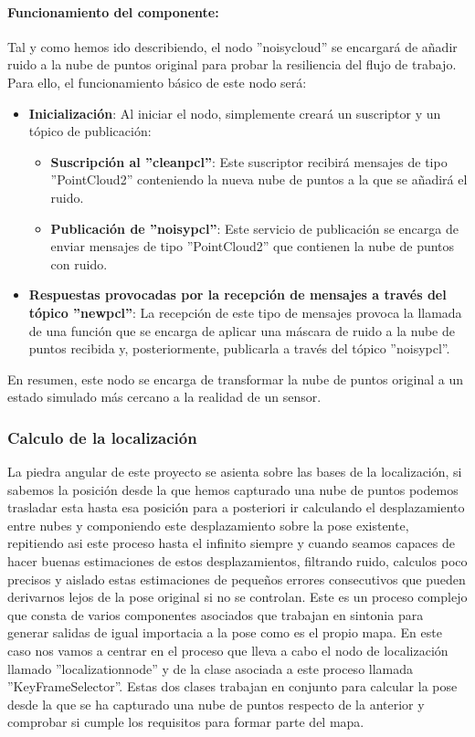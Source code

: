\documentclass[12pt, a4paper, twoside]{article}
\begin{document}
\paragraph{Funcionamiento del componente:} 
Tal y como hemos ido describiendo, el nodo ''noisy\textunderscore cloud'' se encargará de añadir ruido a la nube de puntos original para probar la resiliencia 
del flujo de trabajo. Para ello, el funcionamiento básico de este nodo será:
\begin{itemize}
  \item \textbf{Inicialización}: Al iniciar el nodo, simplemente creará un suscriptor y un tópico de publicación:
  \begin{itemize}
    \item \textbf{Suscripción al ''clean\textunderscore pcl''}: Este suscriptor recibirá mensajes de tipo ''PointCloud2'' conteniendo la nueva nube de puntos
    a la que se añadirá el ruido.
    \item \textbf{Publicación de ''noisy\textunderscore pcl''}: Este servicio de publicación se encarga de enviar mensajes de tipo ''PointCloud2'' que 
    contienen la nube de puntos con ruido. 
  \end{itemize}
  \item \textbf{Respuestas provocadas por la recepción de mensajes a través del tópico ''new\textunderscore pcl''}: La recepción de este tipo de mensajes 
  provoca la llamada de una función que se encarga de aplicar una máscara de ruido a la nube de puntos recibida y, posteriormente, publicarla a través del 
  tópico ''noisy\textunderscore pcl''.
\end{itemize}
En resumen, este nodo se encarga de transformar la nube de puntos original a un estado simulado más cercano a la realidad de un sensor.

\subsubsection{Calculo de la localización}
La piedra angular de este proyecto se asienta sobre las bases de la localización, si sabemos la posición desde la que hemos capturado una nube de puntos
podemos trasladar esta hasta esa posición para a posteriori ir calculando el desplazamiento entre nubes y componiendo este desplazamiento sobre la pose
existente, repitiendo asi este proceso hasta el infinito siempre y cuando seamos capaces de hacer buenas estimaciones de estos desplazamientos, filtrando
ruido, calculos poco precisos y aislado estas estimaciones de pequeños errores consecutivos que pueden derivarnos lejos de la pose original si no se 
controlan. \newline
Este es un proceso complejo que consta de varios componentes asociados que trabajan en sintonia para generar salidas de igual importacia a la pose como 
es el propio mapa. En este caso nos vamos a centrar en el proceso que lleva a cabo el nodo de localización llamado ''localization\textunderscore node''
y de la clase asociada a este proceso llamada ''KeyFrameSelector''. Estas dos clases trabajan en conjunto para calcular la pose desde la que se ha capturado 
una nube de puntos respecto de la anterior y comprobar si cumple los requisitos para formar parte del mapa.
\end{document}
